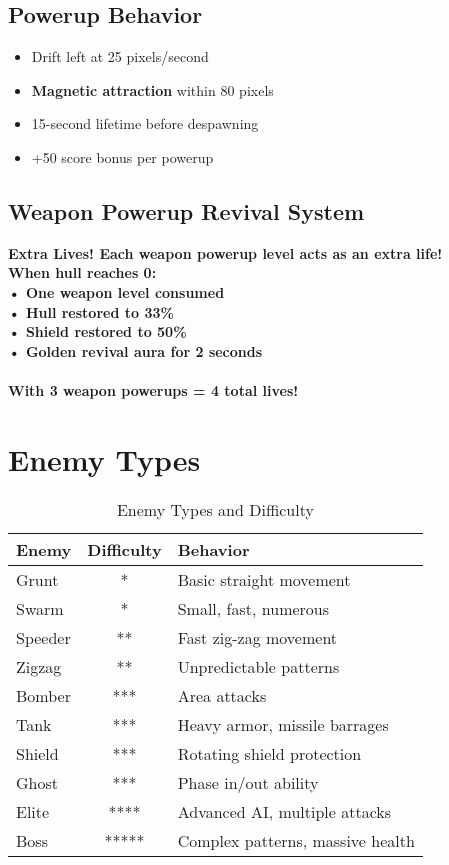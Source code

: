 \documentclass[11pt,a4paper]{article}
\newcommand{\infobox}[2]{%
    \vspace{0.3cm}
    \noindent\colorbox{#1!10}{%
        \parbox{\dimexpr\textwidth-2\fboxsep}{%
            \textcolor{#1}{\textbf{#2}}
        }
    }
    \vspace{0.3cm}
}
\begin{document}
\subsection{Powerup Behavior}
\begin{itemize}
    \item Drift left at 25 pixels/second
    \item \textbf{Magnetic attraction} within 80 pixels
    \item 15-second lifetime before despawning
    \item +50 score bonus per powerup
\end{itemize}

\subsection{Weapon Powerup Revival System}

\infobox{successcolor}{\textbf{Extra Lives!} Each weapon powerup level acts as an extra life!\\
When hull reaches 0:\\
• One weapon level consumed\\
• Hull restored to 33\%\\
• Shield restored to 50\%\\
• Golden revival aura for 2 seconds\\
\\
With 3 weapon powerups = \textbf{4 total lives!}}

\section{Enemy Types}

\begin{table}[h]
\centering
\footnotesize
\begin{tabularx}{\textwidth}{|l|c|X|}
\hline
\rowcolor{primarycolor!20}
\textbf{Enemy} & \textbf{Difficulty} & \textbf{Behavior} \\
\hline
Grunt & * & Basic straight movement \\
\hline
Swarm & * & Small, fast, numerous \\
\hline
Speeder & ** & Fast zig-zag movement \\
\hline
Zigzag & ** & Unpredictable patterns \\
\hline
Bomber & *** & Area attacks \\
\hline
Tank & *** & Heavy armor, missile barrages \\
\hline
Shield & *** & Rotating shield protection \\
\hline
Ghost & *** & Phase in/out ability \\
\hline
Elite & **** & Advanced AI, multiple attacks \\
\hline
Boss & ***** & Complex patterns, massive health \\
\hline
\end{tabularx}
\caption{Enemy Types and Difficulty}
\end{table}
\end{document}
